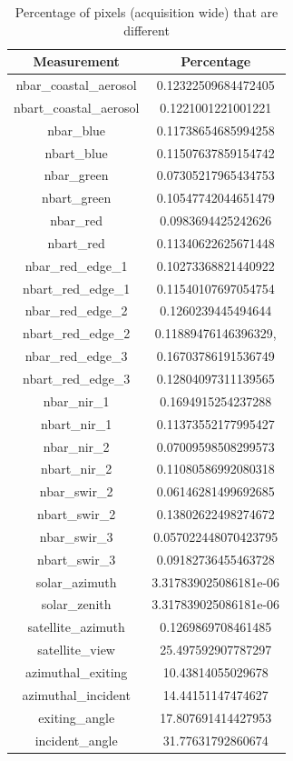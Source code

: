 \documentclass[a4paper]{article}
\begin{document}
    \begin{table}[ht!]
      \caption{Percentage of pixels (acquisition wide) that are different}\label{table:4}
      \centering
      \begin{tabular}{cc} \midrule
        \textbf{Measurement} & \textbf{Percentage} \\ \midrule
        nbar\_coastal\_aerosol & 0.12322509684472405 \\
        nbart\_coastal\_aerosol & 0.1221001221001221 \\
        nbar\_blue & 0.11738654685994258 \\
        nbart\_blue & 0.11507637859154742 \\
        nbar\_green & 0.07305217965434753 \\
        nbart\_green & 0.10547742044651479 \\
        nbar\_red & 0.0983694425242626 \\
        nbart\_red & 0.11340622625671448 \\
        nbar\_red\_edge\_1 & 0.10273368821440922 \\
        nbart\_red\_edge\_1 & 0.11540107697054754 \\
        nbar\_red\_edge\_2 & 0.1260239445494644 \\
        nbart\_red\_edge\_2 & 0.11889476146396329, \\
        nbar\_red\_edge\_3 & 0.16703786191536749 \\
        nbart\_red\_edge\_3 & 0.12804097311139565 \\
        nbar\_nir\_1 & 0.1694915254237288 \\
        nbart\_nir\_1 & 0.11373552177995427 \\
        nbar\_nir\_2 & 0.07009598508299573 \\
        nbart\_nir\_2 & 0.11080586992080318 \\
        nbar\_swir\_2 & 0.06146281499692685 \\
        nbart\_swir\_2 & 0.13802622498274672 \\
        nbar\_swir\_3 & 0.057022448070423795 \\
        nbart\_swir\_3 & 0.09182736455463728 \\
        solar\_azimuth & 3.317839025086181e-06 \\
        solar\_zenith & 3.317839025086181e-06 \\
        satellite\_azimuth & 0.1269869708461485 \\
        satellite\_view & 25.497592907787297 \\
        azimuthal\_exiting & 10.43814055029678 \\
        azimuthal\_incident & 14.44151147474627 \\
        exiting\_angle & 17.807691414427953 \\
        incident\_angle & 31.77631792860674 \\ \midrule
      \end{tabular}
    \end{table}
\end{document}
